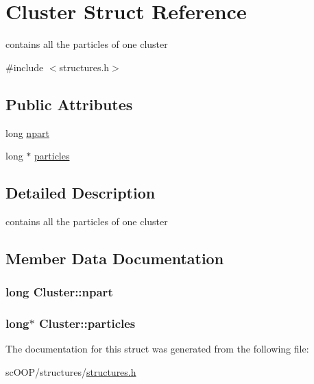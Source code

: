 \hypertarget{struct_cluster}{\section{Cluster Struct Reference}
\label{struct_cluster}
}


contains all the particles of one cluster  




{\ttfamily \#include $<$structures.\+h$>$}

\subsection*{Public Attributes}
\begin{DoxyCompactItemize}
\item 
long \hyperlink{struct_cluster_ade4bba0e66c1644effb8546ecf3bd6e3}{npart}
\item 
long $\ast$ \hyperlink{struct_cluster_a5a7b9b56c48051aba1bc45440c3b1e08}{particles}
\end{DoxyCompactItemize}


\subsection{Detailed Description}
contains all the particles of one cluster 

\subsection{Member Data Documentation}
\hypertarget{struct_cluster_ade4bba0e66c1644effb8546ecf3bd6e3}{
\subsubsection[{npart}]{\setlength{\rightskip}{0pt plus 5cm}long Cluster\+::npart}}\label{struct_cluster_ade4bba0e66c1644effb8546ecf3bd6e3}
\hypertarget{struct_cluster_a5a7b9b56c48051aba1bc45440c3b1e08}{
\subsubsection[{particles}]{\setlength{\rightskip}{0pt plus 5cm}long$\ast$ Cluster\+::particles}}\label{struct_cluster_a5a7b9b56c48051aba1bc45440c3b1e08}


The documentation for this struct was generated from the following file\+:\begin{DoxyCompactItemize}
\item 
sc\+O\+O\+P/structures/\hyperlink{structures_8h}{structures.\+h}\end{DoxyCompactItemize}
